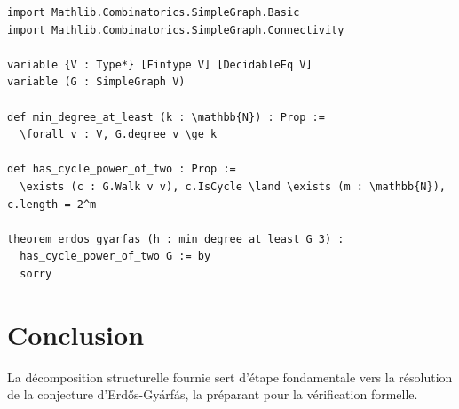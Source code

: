 \documentclass[11pt,a4paper]{article}
\begin{document}
\begin{verbatim}
import Mathlib.Combinatorics.SimpleGraph.Basic
import Mathlib.Combinatorics.SimpleGraph.Connectivity

variable {V : Type*} [Fintype V] [DecidableEq V]
variable (G : SimpleGraph V)

def min_degree_at_least (k : \mathbb{N}) : Prop :=
  \forall v : V, G.degree v \ge k

def has_cycle_power_of_two : Prop :=
  \exists (c : G.Walk v v), c.IsCycle \land \exists (m : \mathbb{N}), c.length = 2^m

theorem erdos_gyarfas (h : min_degree_at_least G 3) :
  has_cycle_power_of_two G := by
  sorry
\end{verbatim}

\section{Conclusion}
La décomposition structurelle fournie sert d'étape fondamentale vers la résolution de la conjecture d'Erd\H{o}s-Gy\'{a}rf\'{a}s, la préparant pour la vérification formelle.
\end{document}
